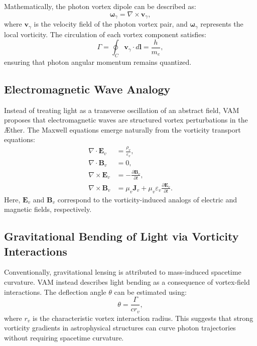 Mathematically, the photon vortex dipole can be described as:
\begin{equation}
    \boldsymbol{\omega}_{\gamma} = \nabla \times \mathbf{v}_{\gamma},
\end{equation}
where $\mathbf{v}_{\gamma}$ is the velocity field of the photon vortex pair, and $\boldsymbol{\omega}_{\gamma}$ represents the local vorticity. The circulation of each vortex component satisfies:
\begin{equation}
    \Gamma = \oint_C \mathbf{v}_{\gamma} \cdot d\mathbf{l} = \frac{h}{m_e},
\end{equation}
ensuring that photon angular momentum remains quantized.

\subsection{Electromagnetic Wave Analogy}
Instead of treating light as a transverse oscillation of an abstract field, VAM proposes that electromagnetic waves are structured vortex perturbations in the Æther. The Maxwell equations emerge naturally from the vorticity transport equations:
\begin{align}
    \nabla \cdot \mathbf{E}_v &= \frac{\rho_v}{\varepsilon_v}, \\
    \nabla \cdot \mathbf{B}_v &= 0, \\
    \nabla \times \mathbf{E}_v &= - \frac{\partial \mathbf{B}_v}{\partial t}, \\
    \nabla \times \mathbf{B}_v &= \mu_v \mathbf{J}_v + \mu_v \varepsilon_v \frac{\partial \mathbf{E}_v}{\partial t}.
\end{align}
Here, $\mathbf{E}_v$ and $\mathbf{B}_v$ correspond to the vorticity-induced analogs of electric and magnetic fields, respectively.

\subsection{Gravitational Bending of Light via Vorticity Interactions}
Conventionally, gravitational lensing is attributed to mass-induced spacetime curvature. VAM instead describes light bending as a consequence of vortex-field interactions. The deflection angle $\theta$ can be estimated using:
\begin{equation}
    \theta = \frac{\Gamma}{c r_v},
\end{equation}
where $r_v$ is the characteristic vortex interaction radius. This suggests that strong vorticity gradients in astrophysical structures can curve photon trajectories without requiring spacetime curvature.

